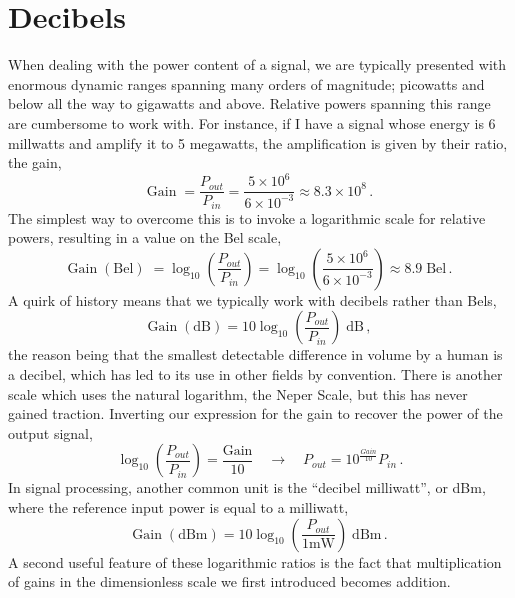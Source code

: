 \section{Decibels}
%
When dealing with the power content of a signal, we are typically presented with enormous
dynamic ranges spanning many orders of magnitude; picowatts and below all the way to
gigawatts and above. Relative powers spanning this range are cumbersome to work with.
For instance, if I have a signal whose energy is 6 millwatts and amplify it to 5 megawatts,
the amplification is given by their ratio, the gain,
%
\begin{displaymath}
  \mathrm{Gain}\; = \frac{P_{out}}{P_{in}} = \frac{5\times 10^6}{6\times 10^{-3}}
  \approx 8.3\times 10^8 \,.
\end{displaymath}
%
The simplest way to overcome this is to invoke a logarithmic scale for relative
powers, resulting in a value on the Bel scale,
%
\begin{displaymath}
  \mathrm{Gain}\;\mathrm{(Bel)}\; = \log_{10}\left(\frac{P_{out}}{P_{in}}\right)
  = \log_{10}\left(\frac{5\times 10^6}{6\times 10^{-3}}\right) \approx 8.9\; \mathrm{Bel} \,.
\end{displaymath}
%
A quirk of history means that we typically work with decibels rather than Bels,
%
\begin{displaymath}
  \mathrm{Gain}\;\mathrm{(dB)} = 10\log_{10}\left(\frac{P_{out}}{P_{in}}\right)\; \mathrm{dB} \,,
\end{displaymath}
%
the reason being that the smallest detectable difference in volume by a human is
a decibel, which has led to its use in other fields by convention. There is another
scale which uses the natural logarithm, the Neper Scale, but this has never gained
traction. Inverting our expression for the gain to recover the power of the output signal,
%
\begin{displaymath}
  \log_{10}\left(\frac{P_{out}}{P_{in}}\right) = \frac{\mathrm{Gain}}{10}
  \quad\rightarrow\quad
  P_{out} = 10^{\frac{Gain}{10}}P_{in} \,.
\end{displaymath}
%
In signal processing, another common unit is the ``decibel milliwatt'', or dBm, where
the reference input power is equal to a milliwatt,
%
\begin{displaymath}
  \mathrm{Gain}\;\mathrm{(dBm)} = 10\log_{10}\left(\frac{P_{out}}{1\mathrm{mW}}\right)\; \mathrm{dBm} \,.
\end{displaymath}
%
A second useful feature of these logarithmic ratios is the fact that multiplication
of gains in the dimensionless scale we first introduced becomes addition.
